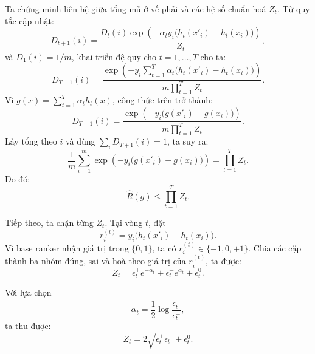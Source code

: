 Ta chứng minh liên hệ giữa tổng mũ ở vế phải và các hệ số chuẩn hoá \(Z_t\). Từ quy tắc cập nhật:
\[
    D_{t+1}(i)
    =
    \frac{
        D_t(i)
        \exp
        \left(
            -\alpha_t
            y_i
            \big(h_t(x'_i)-h_t(x_i)\big)
        \right)
    }{
        Z_t
    },
\]
và \(D_1(i)=1/m\), khai triển đệ quy cho \(t=1,\ldots,T\) cho ta:
\[
    D_{T+1}(i)
    =
    \frac{
        \exp
        \left(
            -y_i
            \sum_{t=1}^{T}
            \alpha_t
            \big(h_t(x'_i)-h_t(x_i)\big)
        \right)
    }{
        m\prod_{t=1}^{T} Z_t
    }.
\]
Vì \(g(x)=\sum_{t=1}^{T}\alpha_t h_t(x)\), công thức trên trở thành:
\[
    D_{T+1}(i)
    =
    \frac{
        \exp
        \left(
            -y_i
            \big(g(x'_i)-g(x_i)\big)
        \right)
    }{
        m\prod_{t=1}^{T} Z_t
    }.
\]
Lấy tổng theo \(i\) và dùng \(\sum_i D_{T+1}(i)=1\), ta suy ra:
\[
    \frac{1}{m}
    \sum_{i=1}^{m}
    \exp
    \left(
        -y_i
        \big(g(x'_i)-g(x_i)\big)
    \right)
    =
    \prod_{t=1}^{T}Z_t.
\]
Do đó:
\[
    \widehat{R}(g)
    \leq
    \prod_{t=1}^{T}Z_t.
\]

Tiếp theo, ta chặn từng \(Z_t\). Tại vòng \(t\), đặt
\[
    r_i^{(t)}
    =
    y_i
    \big(h_t(x'_i)-h_t(x_i)\big).
\]
Vì base ranker nhận giá trị trong \(\{0,1\}\), ta có \(r_i^{(t)}\in\{-1,0,+1\}\). Chia các cặp thành ba nhóm đúng, sai và hoà theo giá trị của \(r_i^{(t)}\), ta được:
\[
    Z_t
    =
    \epsilon_t^{+}e^{-\alpha_t}
    +
    \epsilon_t^{-}e^{\alpha_t}
    +
    \epsilon_t^{0}.
\]

Với lựa chọn
\[
    \alpha_t
    =
    \frac{1}{2}
    \log
    \frac{\epsilon_t^{+}}{\epsilon_t^{-}},
\]
ta thu được:
\[
    Z_t
    =
    2\sqrt{\epsilon_t^{+}\epsilon_t^{-}}
    +
    \epsilon_t^{0}.
\]

